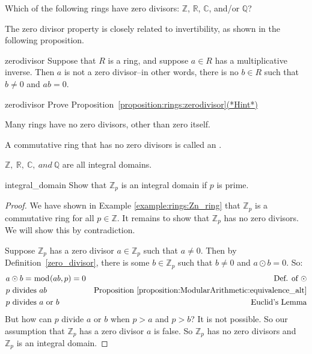\begin{exercise}{}
Which of the following rings have zero divisors: $\mathbb{Z}$, $\mathbb{R}$, $\mathbb{C}$, and/or $\mathbb{Q}$?
\end{exercise}

The zero divisor property is closely related to invertibility, as shown in the following proposition.

\begin{prop}{zerodivisor}
Suppose that $R$ is a ring, and suppose $a \in R$ has a multiplicative inverse. Then $a$ is not a zero divisor--in other words, there is no $b \in R$ such that $b\neq 0$ and $a   b = 0$.
\end{prop}

\begin{exercise}{zerodivisor}
Prove Proposition~\ref{proposition:rings:zerodivisor}\hyperref[ringsHints]{(*Hint*)} 
\end{exercise}

Many rings have no zero divisors, other than zero itself.

\begin{defn}\label{int_dom}
A commutative ring that has no zero divisors is called an .
\end{defn}

${\mathbb Z},~{\mathbb R},~{\mathbb C},~and~{\mathbb Q}$ are all integral domains.

\begin{example}{integral_domain}
Show that ${\mathbb Z}_p$ is an integral domain if $p$ is prime.

\begin{proof}
We have shown in Example \ref{example:rings:Zn_ring} that ${\mathbb Z}_p$ is a commutative ring for all $p\in{\mathbb Z}$.  It remains to show that ${\mathbb Z}_p$ has no zero divisors.  We will show this by contradiction.

Suppose ${\mathbb Z}_p$ has a zero divisor $a\in{\mathbb Z}_p$ such that $a\neq 0$.  Then by Definition~\ref{zero_divisor}, there is some $b\in{\mathbb Z}_p$ such that $b\neq 0$ and $a\odot b=0$.  So:
\begin{align*}
&a\odot b=\bmod(ab,p)=0 & \text{Def. of }\odot\\
&p \text{ divides } ab & \text{Proposition }\ref{proposition:ModularArithmetic:equivalence_alt}\\
&p \text{ divides } a \text{ or } b & \text{Euclid's Lemma}\\
\end{align*}
But how can $p$ divide $a$ or $b$ when $p>a$ and $p>b$?  It is not possible.  So our assumption that ${\mathbb Z}_p$ has a zero divisor $a$ is false.  So ${\mathbb Z}_p$ has no zero divisors and ${\mathbb Z}_p$ is an integral domain.
\end{proof}
\end{example}

